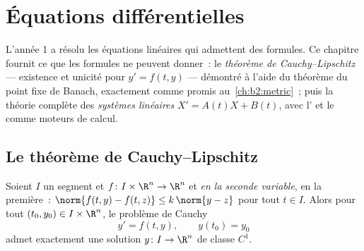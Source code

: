 \chapter{Équations différentielles}\label{ch:b2:diffeq}

L'année 1 a résolu les équations linéaires qui admettent des
formules. Ce chapitre fournit ce que les formules ne peuvent
donner~: le \emph{théorème de Cauchy--Lipschitz} --- existence et
unicité pour $y' = f(t, y)$ --- démontré à l'aide du théorème du
point fixe de Banach, exactement comme promis au~\cref{ch:b2:metric}~;
puis la théorie complète des \emph{systèmes linéaires} $X' = A(t)X +
B(t)$, avec l' et le  comme moteurs
de calcul.

\section{Le théorème de Cauchy--Lipschitz}

\begin{theorem}\label{thm:b2:diffeq:cauchylipschitz}
Soient $I$ un segment et $f \colon I \times \R^n \to \R^n$ 
et \emph{ en la seconde variable},  en la
première~: $\norm{f(t, y) - f(t, z)} \leq k\,\norm{y - z}$ pour tout
$t \in I$. Alors pour tout $(t_0, y_0) \in I \times \R^n$, le
problème de Cauchy
\[
y' = f(t, y), \qquad y(t_0) = y_0
\]
admet exactement une solution $y \colon I \to \R^n$ de classe $C^1$.
\end{theorem}

